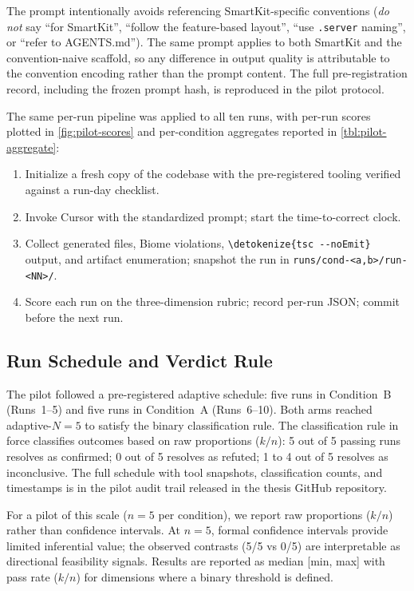 \documentclass[12pt,a4paper]{report}
\newcommand{\code}[1]{\texttt{\nolinkurl{\detokenize{#1}}}}
\DeclareRobustCommand{\filename}[1]{\bgroup\urlstyle{tt}\nolinkurl{#1}\egroup}
\begin{document}
The prompt intentionally avoids referencing SmartKit-specific conventions (\emph{do not} say ``for SmartKit'', ``follow the feature-based layout'', ``use \filename{.server} naming'', or ``refer to AGENTS.md''). The same prompt applies to both SmartKit and the convention-naive scaffold, so any difference in output quality is attributable to the convention encoding rather than the prompt content. The full pre-registration record, including the frozen prompt hash, is reproduced in the pilot protocol.

The same per-run pipeline was applied to all ten runs, with per-run scores plotted in \autoref{fig:pilot-scores} and per-condition aggregates reported in \autoref{tbl:pilot-aggregate}:
\begin{enumerate}
    \item Initialize a fresh copy of the codebase with the pre-registered tooling verified against a run-day checklist.
    \item Invoke Cursor with the standardized prompt; start the time-to-correct clock.
    \item Collect generated files, Biome violations, \code{tsc --noEmit} output, and artifact enumeration; snapshot the run in \filename{runs/cond-<a,b>/run-<NN>/}.
    \item Score each run on the three-dimension rubric; record per-run JSON; commit before the next run.
\end{enumerate}

\subsection{Run Schedule and Verdict Rule}
\label{sec:pilot-schedule}

The pilot followed a pre-registered adaptive schedule: five runs in Condition~B (Runs~1--5) and five runs in Condition~A (Runs~6--10). Both arms reached adaptive-$N=5$ to satisfy the binary classification rule. The classification rule in force classifies outcomes based on raw proportions ($k/n$): 5 out of 5 passing runs resolves as confirmed; 0 out of 5 resolves as refuted; 1 to 4 out of 5 resolves as inconclusive. The full schedule with tool snapshots, classification counts, and timestamps is in the pilot audit trail released in the thesis GitHub repository.

For a pilot of this scale ($n=5$ per condition), we report raw proportions ($k/n$) rather than confidence intervals. At $n=5$, formal confidence intervals provide limited inferential value; the observed contrasts (5/5 vs 0/5) are interpretable as directional feasibility signals. Results are reported as median [min, max] with pass rate ($k/n$) for dimensions where a binary threshold is defined.
\end{document}
